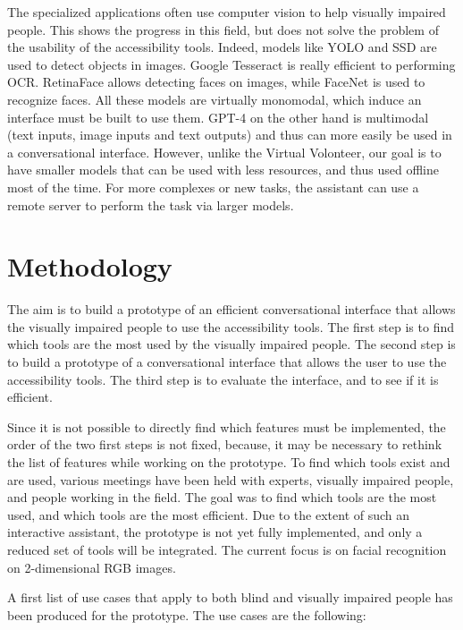\documentclass[sigconf]{acmart}
\begin{document}
The specialized applications often use computer vision to help visually impaired people. This shows the progress in this field, but does not solve the problem of the usability of the accessibility tools. Indeed, models like YOLO and SSD are used to detect objects in images. Google Tesseract\cite{VariousDocumentsRelated2012} is really efficient to performing OCR. RetinaFace\cite{dengRetinaFaceSinglestageDense2019} allows detecting faces on images, while FaceNet\cite{jekelClassifyingOnlineDating2018} is used to recognize faces. All these models are virtually monomodal, which induce an interface must be built to use them. GPT-4 on the other hand is multimodal (text inputs, image inputs and text outputs)\cite{openaiGPT4TechnicalReport2023} and thus can more easily be used in a conversational interface. However, unlike the Virtual Volonteer, our goal is to have smaller models that can be used with less resources, and thus used offline most of the time. For more complexes or new tasks, the assistant can use a remote server to perform the task via larger models.

\section{Methodology}
The aim is to build a prototype of an efficient conversational interface that allows the visually impaired people to use the accessibility tools. The first step is to find which tools are the most used by the visually impaired people. The second step is to build a prototype of a conversational interface that allows the user to use the accessibility tools. The third step is to evaluate the interface, and to see if it is efficient.

Since it is not possible to directly find which features must be implemented, the order of the two first steps is not fixed, because, it may be necessary to rethink the list of features while working on the prototype. To find which tools exist and are used, various meetings have been held with experts, visually impaired people, and people working in the field. The goal was to find which tools are the most used, and which tools are the most efficient. Due to the extent of such an interactive assistant, the prototype is not yet fully implemented, and only a reduced set of tools will be integrated. The current focus is on facial recognition on 2-dimensional RGB images.

A first list of use cases that apply to both blind and visually impaired people has been produced for the prototype. The use cases are the following:
\end{document}

